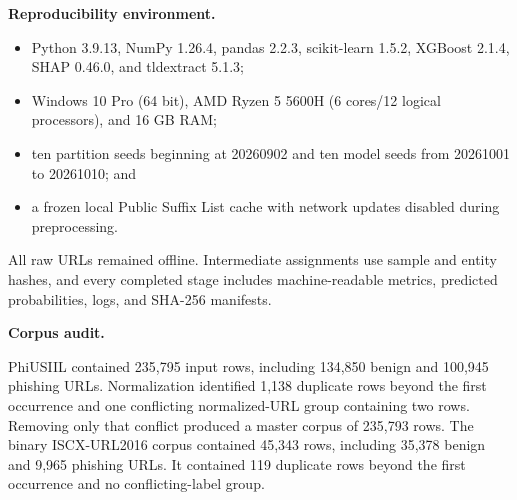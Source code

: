 \documentclass[
  10pt,
]{article}
\providecommand{\tightlist}{%
  \setlength{\itemsep}{0pt}\setlength{\parskip}{0pt}}
\begin{document}
\textbf{Reproducibility environment.}

\begin{itemize}
\tightlist
\item
  Python 3.9.13, NumPy 1.26.4, pandas 2.2.3, scikit-learn 1.5.2, XGBoost
  2.1.4, SHAP 0.46.0, and tldextract 5.1.3;
\item
  Windows 10 Pro (64 bit), AMD Ryzen 5 5600H (6 cores/12 logical
  processors), and 16 GB RAM;
\item
  ten partition seeds beginning at 20260902 and ten model seeds from
  20261001 to 20261010; and
\item
  a frozen local Public Suffix List cache with network updates disabled
  during preprocessing.
\end{itemize}

All raw URLs remained offline. Intermediate assignments use sample and
entity hashes, and every completed stage includes machine-readable
metrics, predicted probabilities, logs, and SHA-256 manifests.

\textbf{Corpus audit.}

PhiUSIIL contained 235,795 input rows, including 134,850 benign and
100,945 phishing URLs. Normalization identified 1,138 duplicate rows
beyond the first occurrence and one conflicting normalized-URL group
containing two rows. Removing only that conflict produced a master
corpus of 235,793 rows. The binary ISCX-URL2016 corpus contained 45,343
rows, including 35,378 benign and 9,965 phishing URLs. It contained 119
duplicate rows beyond the first occurrence and no conflicting-label
group.
\end{document}
